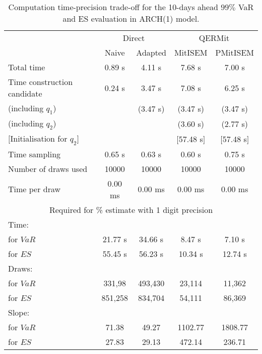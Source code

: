 { \renewcommand{\arraystretch}{1.3} 
\begin{table}[h] 
\centering 
\caption{Computation time-precision trade-off for the 10-days ahead  $99\%$ VaR and ES evaluation in ARCH(1) model.} 
\label{tab:time_precision_arch} 
\begin{tabular}{lcccc}  
  & \multicolumn{2}{c}{Direct} & \multicolumn{2}{c}{QERMit}  \\ \cline{2-5} 
  & Naive & Adapted & MitISEM & PMitISEM  \\ \hline 
Total time & 0.89 s & 4.11 s & 7.68 s & 7.00 s \\ 
Time construction candidate & 0.24 s & 3.47 s & 7.08 s & 6.25 s \\ 
 (including $q_{1}$) &   &  (3.47 s) & (3.47 s) & (3.47 s) \\ 
 (including $q_{2}$) &   &  & (3.60 s) & (2.77 s) \\ 
$[$Initialisation for $q_{2}$$]$&   &   & $[$57.48 s$]$ & $[$57.48 s$]$ \\ 
Time sampling & 0.65 s & 0.63 s & 0.60 s & 0.75 s  \\  
Number of draws used & 10000 & 10000 & 10000 & 10000 \\ 
Time per draw & 0.00 ms & 0.00 ms & 0.00 ms & 0.00 ms \\ \hline 
\multicolumn{5}{c}{Required for \% estimate with 1 digit precision} \\ \hline 
Time: &  &  &   &  \\ 
\hspace{1cm} for $VaR$ & 21.77 s & 34.66 s & 8.47 s & 7.10 s \\ 
\hspace{1cm} for $ES$ & 55.45 s & 56.23 s & 10.34 s & 12.74 s \\ 
Draws: &  &  &   &  \\ 
\hspace{1cm} for $VaR$ & 331,98 & 493,430  & 23,114  & 11,362  \\ 
\hspace{1cm} for $ES$ & 851,258 & 834,704  & 54,111   & 86,369  \\ 
\hline 
Slope: &  &  &   &  \\ 
\hspace{1cm} for $VaR$ & 71.38 & 49.27  & 1102.77  & 1808.77  \\ 
\hspace{1cm} for $ES$ & 27.83 & 29.13  & 472.14   & 236.71  \\  \hline 
\end{tabular} 
\end{table} 
} 
